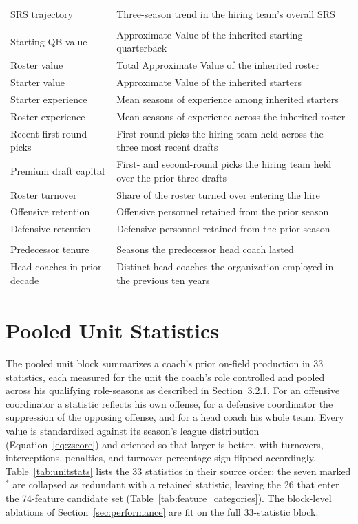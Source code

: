 \documentclass[USenglish]{article}
\theoremstyle{dgthm}
\theoremstyle{dgdef}
\begin{document}
{\begin{longtable}{@{}l p{8.6cm}@{}}
SRS trajectory & Three-season trend in the hiring team's overall SRS \\
\addlinespace
\multicolumn{2}{@{}l}{\emph{Inherited roster (10)}}\\[2pt]
Starting-QB value & Approximate Value of the inherited starting quarterback \\
Roster value & Total Approximate Value of the inherited roster \\
Starter value & Approximate Value of the inherited starters \\
Starter experience & Mean seasons of experience among inherited starters \\
Roster experience & Mean seasons of experience across the inherited roster \\
Recent first-round picks & First-round picks the hiring team held across the three most recent drafts \\
Premium draft capital & First- and second-round picks the hiring team held over the prior three drafts \\
Roster turnover & Share of the roster turned over entering the hire \\
Offensive retention & Offensive personnel retained from the prior season \\
Defensive retention & Defensive personnel retained from the prior season \\
\addlinespace
\multicolumn{2}{@{}l}{\emph{Organizational instability (2)}}\\[2pt]
Predecessor tenure & Seasons the predecessor head coach lasted \\
Head coaches in prior decade & Distinct head coaches the organization employed in the previous ten years \\
\end{longtable}
}

\section{Pooled Unit Statistics}
\label{app:unitstats}

The pooled unit block summarizes a coach's prior on-field production in 33 statistics, each measured for the unit the coach's role controlled and pooled across his qualifying role-seasons as described in Section~3.2.1. For an offensive coordinator a statistic reflects his own offense, for a defensive coordinator the suppression of the opposing offense, and for a head coach his whole team. Every value is standardized against its season's league distribution (Equation~\ref{eq:zscore}) and oriented so that larger is better, with turnovers, interceptions, penalties, and turnover percentage sign-flipped accordingly. Table~\ref{tab:unitstats} lists the 33 statistics in their source order; the seven marked $^{\ast}$ are collapsed as redundant with a retained statistic, leaving the 26 that enter the 74-feature candidate set (Table~\ref{tab:feature_categories}). The block-level ablations of Section~\ref{sec:performance} are fit on the full 33-statistic block.
\end{document}
